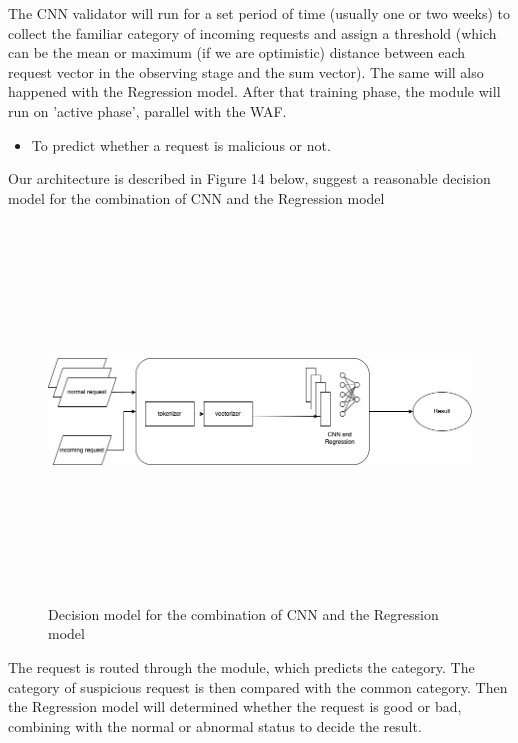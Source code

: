 The CNN validator will run for a set period of time (usually one or two weeks) to collect the familiar category of incoming requests and assign a threshold (which can be the mean or maximum (if we are optimistic) distance between each request vector in the observing stage and the sum vector). The same will also happened with the Regression model. After that training phase, the module will run on 'active phase', parallel with the WAF. 
\begin{itemize}
    \item  To predict whether a request is malicious or not.
\end{itemize}
Our architecture is described in Figure 14 below, suggest a reasonable decision model for the combination of CNN and the Regression model
\begin{figure}[!h]
     \centering
     \includegraphics[width=\linewidth, height=10cm,keepaspectratio]{figures/architecture 2.drawio.png}
   \caption{Decision model for the combination of CNN and the Regression model}
\end{figure}
\newpage
The request is routed through the module, which predicts the category. The category of suspicious request is then compared with the common category. Then the Regression model will determined whether the request is good or bad, combining with the normal or abnormal status to decide the result. 
